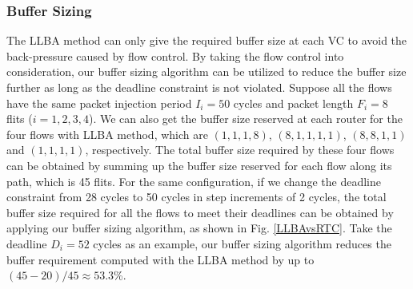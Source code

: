 \documentclass[preprint]{elsarticle}
\begin{document}
\subsubsection{Buffer Sizing}
The LLBA method \cite{189} can only give the required buffer size at each VC to avoid the back-pressure caused by flow control. By taking the flow control into consideration, our buffer sizing algorithm can be utilized to reduce the buffer size further as long as the deadline constraint is not violated. Suppose all the flows have the same packet injection period $I_i=50$ cycles and packet length $F_i=8$ flits ($i=1,2,3,4$). We can also get the buffer size reserved at each router for the four flows with LLBA method, which are $(1,1,1,8)$, $(8,1,1,1,1)$, $(8,8,1,1)$ and $(1,1,1,1)$, respectively. The total buffer size required by these four flows can be obtained by summing up the buffer size reserved for each flow along its path, which is 45 flits. For the same configuration, if we change the deadline constraint from 28 cycles to 50 cycles in step increments of 2 cycles, the total buffer size required for all the flows to meet their deadlines can be obtained by applying our buffer sizing algorithm, as shown in Fig. \ref{LLBAvsRTC}. Take the deadline $D_i=52$ cycles as an example, our buffer sizing algorithm reduces the buffer requirement computed with the LLBA method by up to $(45-20)/45\approx53.3$\%.
\end{document}
